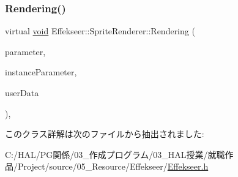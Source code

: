 \subsubsection{\texorpdfstring{Rendering()}{Rendering()}}
{\footnotesize\ttfamily virtual \mbox{\hyperlink{namespace_effekseer_ab34c4088e512200cf4c2716f168deb56}{void}} Effekseer\+::\+Sprite\+Renderer\+::\+Rendering (\begin{DoxyParamCaption}\item[{const \mbox{\hyperlink{struct_effekseer_1_1_sprite_renderer_1_1_node_parameter}{Node\+Parameter}} \&}]{parameter,  }\item[{const \mbox{\hyperlink{struct_effekseer_1_1_sprite_renderer_1_1_instance_parameter}{Instance\+Parameter}} \&}]{instance\+Parameter,  }\item[{\mbox{\hyperlink{namespace_effekseer_ab34c4088e512200cf4c2716f168deb56}{void}} $\ast$}]{user\+Data }\end{DoxyParamCaption})\hspace{0.3cm}{\ttfamily [inline]}, {\ttfamily [virtual]}}



このクラス詳解は次のファイルから抽出されました\+:\begin{DoxyCompactItemize}
\item 
C\+:/\+H\+A\+L/\+P\+G関係/03\+\_\+作成プログラム/03\+\_\+\+H\+A\+L授業/就職作品/\+Project/source/05\+\_\+\+Resource/\+Effekseer/\mbox{\hyperlink{_effekseer_8h}{Effekseer.\+h}}\end{DoxyCompactItemize}
